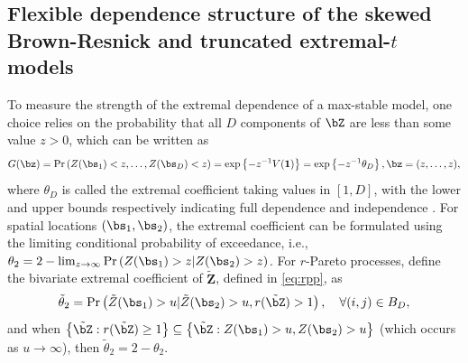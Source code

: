 \documentclass[12pt]{article}
\begin{document}
\subsection{Flexible dependence structure of the skewed Brown-Resnick and truncated extremal-$t$ models}
\label{ssec:flex_dep}
To measure the strength of the extremal dependence of a max-stable model, one choice relies on the probability that all $D$ components of $\bZ$ are less than some value $z>0$, which can be written as
%
\begin{align*}
G(\bz) 
= \Pr \left( Z(\bs_1) < z, \ldots, Z(\bs_D)< z \right)
= \exp \left\{ - z^{-1} V(\bm 1)\right\}
= \exp \left\{ - z^{-1} \theta_{D}\right\}, \bz = (z, \ldots, z),
\end{align*}
%
where $\theta_{D}$ is called the extremal coefficient
taking values in $[1,D]$, with the lower and upper bounds respectively indicating full dependence and independence \citep[see][]{Smith:1990b, Davison.etal:2012}.
For spatial locations $(\bs_1, \bs_2)$, the extremal coefficient can be formulated using the limiting conditional probability of exceedance, i.e., $\theta_{2}= 2-\lim_{z\to\infty}\Pr\left(Z(\bs_1)>z|Z(\bs_2)>z\right)$. 
%
For $r$-Pareto processes, \citet{deFondeville.Davison:2018} define the bivariate extremal coefficient of $\bm{\tilde Z}$, defined in \eqref{eq:rpp}, as 
\begin{equation*}
\tilde{\theta}_{2} = 
\Pr\left(\tilde{Z}(\bs_1)>u|\tilde{Z}(\bs_2)>u, r(\tilde{\bZ})>1\right), \quad \forall (i,j) \in B_D, 
\end{equation*}
%
and when $\left\{ \tilde{\bZ}: r(\tilde{\bZ}) \geq 1 \right\} \subseteq \left\{ \tilde{\bZ}: Z(\bs_1) >u, Z(\bs_2) >u \right\}$ (which occurs as $u\rightarrow \infty$), then $\tilde{\theta}_{2} = 2 - \theta_{2}$. 
%
\end{document}

